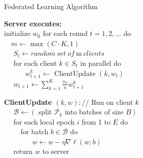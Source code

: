 
\begin{algorithm}
  \caption{Federated Learning Algorithm}
  
  \begin{algorithmic}
    \STATE \textbf{Server executes: \\}
    \STATE initialize $w_0$
    \STATE for each round $t=1,2, \ldots$ do \\
    \STATE $\quad  m \leftarrow \max (C \cdot K, 1)$ \\
    \STATE $\quad$ $S_t \leftarrow random \ set \ of \ $m$ \ clients $  \\
    \STATE $\quad$ for each client $k \in S_t$ in parallel do \\
    \STATE $\quad\quad\quad w_{t+1}^k \leftarrow$ ClientUpdate $\left(k, w_t\right)$ \\
    \STATE $\quad$ $w_{t+1} \leftarrow \sum_{k=1}^K \frac{n_k}{n} w_{t+1}^k$ \newline
    
    \STATE \textbf{ClientUpdate $(k, w): / /$} Run on client $k$ \\
    \STATE $\quad$ $\mathcal{B} \leftarrow\left(\right.$ split $\mathcal{P}_k$ into batches of size $\left.B\right)$ \\
    \STATE $\quad$ for each local epoch $i$ from 1 to $E$ do \\
    \STATE $\quad\quad$ for batch $b \in \mathcal{B}$ do \\
    \STATE $\quad\quad\quad\quad w \leftarrow w-\eta \nabla \ell(w ; b)$ \\
    \STATE $\quad$ return $w$ to server

  \end{algorithmic}
\end{algorithm}



